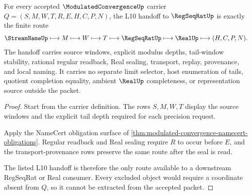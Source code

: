 \begin{theorem}
\label{thm:modulated-convergence-regseqrat-handoff}
For every accepted $\ModulatedConvergenceUp$ carrier $Q=(S,M,W,T,R,E,H,C,P,N)$, the L10 handoff to $\RegSeqRatUp$ is exactly the finite route
$$
\StreamNameUp\longmapsto M\longmapsto W\longmapsto T\longmapsto\RegSeqRatUp\longmapsto\RealUp\longmapsto(H,C,P,N).
$$
The handoff carries source windows, explicit modulus depths, tail-window stability, rational regular readback, Real sealing, transport, replay, provenance, and local naming. It carries no separate limit selector, host enumeration of tails, quotient completion equality, ambient $\RealUp$ completeness, or representation source outside the packet.
\end{theorem}
\begin{proof}
Start from the carrier definition. The rows $S,M,W,T$ display the source windows and the explicit tail depth required for each precision request.

Apply the NameCert obligation surface of \autoref{thm:modulated-convergence-namecert-obligations}. Regular readback and Real sealing require $R$ to occur before $E$, and the transport-provenance rows preserve the same route after the seal is read.

The listed L10 handoff is therefore the only route available to a downstream RegSeqRat or Real consumer. Every excluded object would require a coordinate absent from $Q$, so it cannot be extracted from the accepted packet.
\end{proof}


\begin{closurestatus}{\ModulatedConvergenceUp}
  \theoryclosure{\seedClosure}
  \formalstatus{\unformalizedV}
\end{closurestatus}
